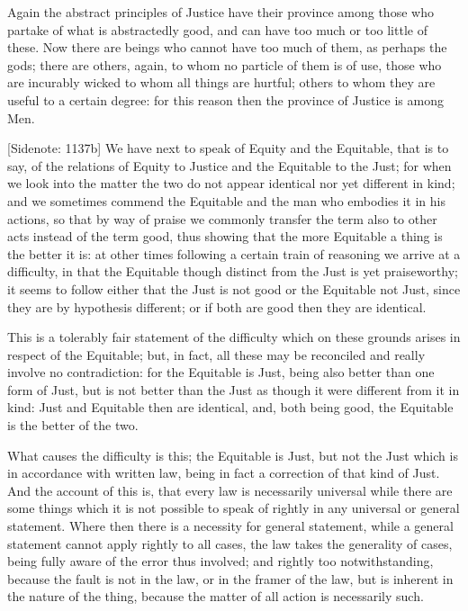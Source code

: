 Again the abstract principles of Justice have their province among those
who partake of what is abstractedly good, and can have too much or too
little of these. Now there are beings who cannot have too much of them,
as perhaps the gods; there are others, again, to whom no particle of
them is of use, those who are incurably wicked to whom all things are
hurtful; others to whom they are useful to a certain degree: for this
reason then the province of Justice is among Men.

[Sidenote: 1137b] We have next to speak of Equity and the Equitable,
that is to say, of the relations of Equity to Justice and the Equitable
to the Just; for when we look into the matter the two do not appear
identical nor yet different in kind; and we sometimes commend the
Equitable and the man who embodies it in his actions, so that by way of
praise we commonly transfer the term also to other acts instead of the
term good, thus showing that the more Equitable a thing is the better it
is: at other times following a certain train of reasoning we arrive at a
difficulty, in that the Equitable though distinct from the Just is yet
praiseworthy; it seems to follow either that the Just is not good or the
Equitable not Just, since they are by hypothesis different; or if both
are good then they are identical.

This is a tolerably fair statement of the difficulty which on these
grounds arises in respect of the Equitable; but, in fact, all these may
be reconciled and really involve no contradiction: for the Equitable is
Just, being also better than one form of Just, but is not better than
the Just as though it were different from it in kind: Just and Equitable
then are identical, and, both being good, the Equitable is the better of
the two.

What causes the difficulty is this; the Equitable is Just, but not the
Just which is in accordance with written law, being in fact a correction
of that kind of Just. And the account of this is, that every law is
necessarily universal while there are some things which it is not
possible to speak of rightly in any universal or general statement.
Where then there is a necessity for general statement, while a general
statement cannot apply rightly to all cases, the law takes the
generality of cases, being fully aware of the error thus involved; and
rightly too notwithstanding, because the fault is not in the law, or
in the framer of the law, but is inherent in the nature of the thing,
because the matter of all action is necessarily such.

